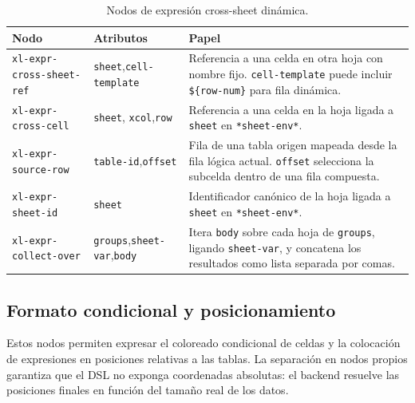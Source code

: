 \begin{table}[h!]
\centering
\caption{Nodos de expresi\'on cross-sheet din\'amica.}
\label{tab:ast-cross-sheet}
\renewcommand{\arraystretch}{1.3}
\begin{tabular}{p{3.8cm} p{4.4cm} p{5.6cm}}
\toprule
\textbf{Nodo} & \textbf{Atributos} & \textbf{Papel} \\
\midrule
\texttt{xl-expr-cross-sheet-ref}
  & \texttt{sheet},\newline\texttt{cell-template}
  & Referencia a una celda en otra hoja con nombre fijo.
    \texttt{cell-template} puede incluir \texttt{\$\{row-num\}} para
    fila din\'amica. \\
\midrule
\texttt{xl-expr-cross-cell}
  & \texttt{sheet}, \texttt{xcol},\newline\texttt{row}
  & Referencia a una celda en la hoja ligada a \texttt{sheet} en
    \texttt{*sheet-env*}. \\
\midrule
\texttt{xl-expr-source-row}
  & \texttt{table-id},\newline\texttt{offset}
  & Fila de una tabla origen mapeada desde la fila l\'ogica actual.
    \texttt{offset} selecciona la subcelda dentro de una fila compuesta. \\
\midrule
\texttt{xl-expr-sheet-id}
  & \texttt{sheet}
  & Identificador can\'onico de la hoja ligada a \texttt{sheet} en
    \texttt{*sheet-env*}. \\
\midrule
\texttt{xl-expr-collect-over}
  & \texttt{groups},\newline\texttt{sheet-var},\newline\texttt{body}
  & Itera \texttt{body} sobre cada hoja de \texttt{groups}, ligando
    \texttt{sheet-var}, y concatena los resultados como lista separada
    por comas. \\
\bottomrule
\end{tabular}
\end{table}

\subsection{Formato condicional y posicionamiento}
\label{sec:ast-formato}

Estos nodos permiten expresar el coloreado condicional de celdas y la
colocaci\'on de expresiones en posiciones relativas a las tablas.  La
separaci\'on en nodos propios garantiza que el DSL no exponga coordenadas
absolutas: el backend resuelve las posiciones finales en funci\'on del
tama\~no real de los datos.

